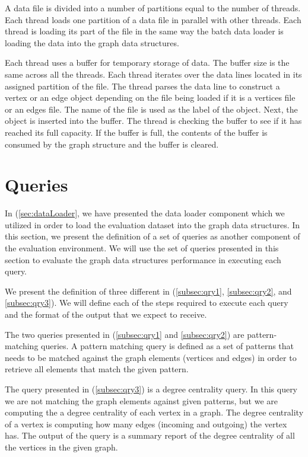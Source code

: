 {A data file is divided into a number of partitions equal to the number of threads. Each thread loads one partition of a data file in parallel with other threads. Each thread is loading its part of the file in the same way the batch data loader is loading the data into the graph data structures. 

Each thread uses a buffer for temporary storage of data. The buffer size is the same across all the threads. Each thread iterates over the data lines located in its assigned partition of the file. The thread parses the data line to construct a vertex or an edge object depending on the file being loaded if it is a vertices file or an edges file. The name of the file is used as the label of the object. Next, the object is inserted into the buffer. The thread is checking the buffer to see if it has reached its full capacity. If the buffer is full, the contents of the buffer is consumed by the graph structure and the buffer is cleared.

\section{Queries}
\label{sec:qryDef}

In (\ref{sec:dataLoader}, we have presented the data loader component which we utilized in order to load the evaluation dataset into the graph data structures. In this section, we present the definition of a set of queries as another component of the evaluation environment. We will use the set of queries presented in this section to evaluate the graph data structures performance in executing each query. 

We present the definition of three different in (\ref{subsec:qry1}, \ref{subsec:qry2}, and \ref{subsec:qry3}). We will define each of the steps required to execute each query and the format of the output that we expect to receive.

The two queries presented in (\ref{subsec:qry1} and \ref{subsec:qry2}) are pattern-matching queries. A pattern matching query is defined as a set of patterns that needs to be matched against the graph elements (vertices and edges) in order to retrieve all elements that match the given pattern.

The query presented in (\ref{subsec:qry3}) is a degree centrality query. In this query we are not matching the graph elements against given patterns, but we are computing the a degree centrality of each vertex in a graph. The degree centrality of a vertex is computing how many edges (incoming and outgoing) the vertex has. The output of the query is a summary report of the degree centrality of all the vertices in the given graph.

}
